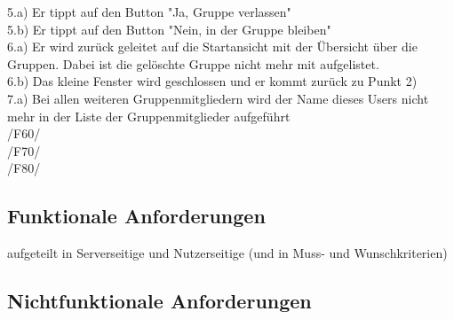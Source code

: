 5.a) Er tippt auf den Button "Ja, Gruppe verlassen"\\
5.b) Er tippt auf den Button "Nein, in der Gruppe bleiben"\\
6.a) Er wird zurück geleitet auf die Startansicht mit der Übersicht über die Gruppen. Dabei ist die gelöschte Gruppe nicht mehr mit aufgelistet.\\
6.b) Das kleine Fenster wird geschlossen und er kommt zurück zu Punkt 2)\\
7.a) Bei allen weiteren Gruppenmitgliedern wird der Name dieses Users nicht mehr in der Liste der Gruppenmitglieder aufgeführt\\ 
/F60/ \\
/F70/ \\

/F80/ \\

\subsection{Funktionale Anforderungen}
aufgeteilt in Serverseitige und Nutzerseitige 
(und in Muss- und Wunschkriterien)
\subsection{Nichtfunktionale Anforderungen}